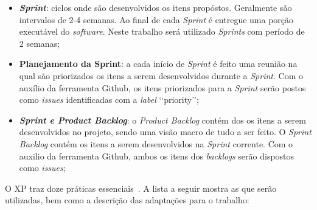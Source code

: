 \begin{itemize}
  \item \textit{\textbf{Sprint}}: ciclos onde são desenvolvidos os itens propóstos. Geralmente
    são intervalos de 2-4 semanas. Ao final de cada \textit{Sprint} é entregue uma porção 
    executável do \textit{software}. Neste trabalho será utilizado \textit{Sprints} com período
    de 2 semanas;
  \item \textbf{Planejamento da Sprint}: a cada início de \textit{Sprint} é feito uma reunião
    na qual são priorizados os itens a serem desenvolvidos durante a \textit{Sprint}.
    Com o auxílio da ferramenta Github, os itens priorizados para a \textit{Sprint} serão
    postos como \textit{issues} identificadas com a \textit{label} \lq\lq priority\rq\rq;
  \item \textbf{\textit{Sprint e Product Backlog}}: o \textit{Product Backlog} contém dos os itens a serem
    desenvolvidos no projeto, sendo uma visão macro de tudo a ser feito.
    O \textit{Sprint Backlog} contém os itens a serem desenvolvidos na \textit{Sprint} corrente.
  Com o auxilio da ferramenta Github, ambos os itens dos \textit{backlogs} serão dispostos
  como \textit{issues};
\end{itemize}

O XP traz doze práticas essenciais~\cite{gutierrez:2009}. A lista a seguir
mostra as que serão utilizadas, bem como a descrição das adaptações para o trabalho:

